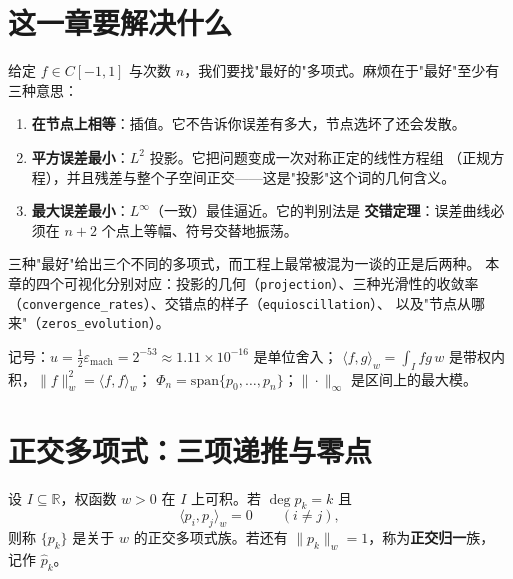 

\section{这一章要解决什么}

给定 $f\in C[-1,1]$ 与次数 $n$，我们要找"最好的"多项式。麻烦在于"最好"至少有三种意思：

\begin{enumerate}
  \item \textbf{在节点上相等}：插值。它不告诉你误差有多大，节点选坏了还会发散。
  \item \textbf{平方误差最小}：$L^2$ 投影。它把问题变成一次对称正定的线性方程组
        （正规方程），并且残差与整个子空间正交——这是"投影"这个词的几何含义。
  \item \textbf{最大误差最小}：$L^\infty$（一致）最佳逼近。它的判别法是
        \textbf{交错定理}：误差曲线必须在 $n+2$ 个点上等幅、符号交替地振荡。
\end{enumerate}

三种"最好"给出三个不同的多项式，而工程上最常被混为一谈的正是后两种。
本章的四个可视化分别对应：投影的几何（\texttt{projection}）、三种光滑性的收敛率
（\texttt{convergence\_rates}）、交错点的样子（\texttt{equioscillation}）、
以及"节点从哪来"（\texttt{zeros\_evolution}）。

记号：$u=\tfrac12\varepsilon_{\text{mach}}=2^{-53}\approx1.11\times10^{-16}$ 是单位舍入；
$\langle f,g\rangle_w=\int_I f g\,w$ 是带权内积，$\|f\|_w^2=\langle f,f\rangle_w$；
$\Phi_n=\mathrm{span}\{p_0,\dots,p_n\}$；$\|\cdot\|_\infty$ 是区间上的最大模。

\section{正交多项式：三项递推与零点}

\begin{definition}[正交多项式]
设 $I\subseteq\mathbb{R}$，权函数 $w>0$ 在 $I$ 上可积。若 $\deg p_k=k$ 且
\[
  \langle p_i,p_j\rangle_w=0\qquad(i\ne j),
\]
则称 $\{p_k\}$ 是关于 $w$ 的正交多项式族。若还有 $\|p_k\|_w=1$，称为\textbf{正交归一}族，
记作 $\hat p_k$。
\end{definition}

